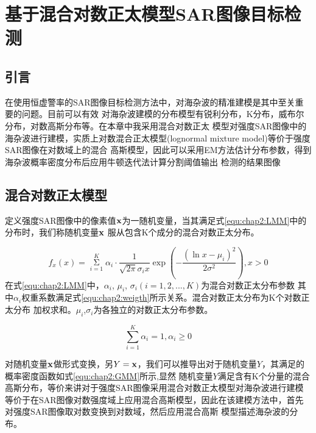 \chapter{基于混合对数正太模型SAR图像目标检测}
\label{cha:LMM}

\section{引言}
\label{sec:chap2:sec1}
在使用恒虚警率的SAR图像目标检测方法中，对海杂波的精准建模是其中至关重要的问题。目前可以有效
对海杂波建模的分布模型有锐利分布，K分布，威布尔分布，对数高斯分布等。在本章中我采用混合对数正太
模型对强度SAR图像中的海杂波进行建模，实质上对数混合正太模型(lognormal mixture model)等价于强度SAR图像在对数域上的混合
高斯模型，因此可以采用EM方法估计分布参数，得到海杂波概率密度分布后应用牛顿迭代法计算分割阈值输出
检测的结果图像


\section{混合对数正太模型}
\label{sec:chap2:sec2}
  定义强度SAR图像中的像素值$\bf{x}$为一随机变量，当其满足式\ref{equ:chap2:LMM}中的分布时，我们称随机变量$\bf{x}$
  服从包含K个成分的混合对数正太分布。

    \begin{equation}
      \label{equ:chap2:LMM}
      {f_x}(x) = \mathop \Sigma \limits_{i = 1}^K {\alpha _i} \cdot \frac{1}{{\sqrt {2\pi } {\sigma _i}x}}\exp ( - \frac{{{{(\ln x - {\mu _i})}^2}}}{{2{\sigma ^2}}}),x > 0
    \end{equation}
  在式\ref{equ:chap2:LMM}中，$\alpha_i$, $\mu_i$, $\sigma_i(i=1,2,...,K)$为混合对数正太分布参数
  其中$\alpha_i$权重系数满足式\ref{equ:chap2:weigth}所示关系。混合对数正太分布为K个对数正太分布
  加权求和。$\mu_i$,$\sigma_i$为各独立的对数正太分布参数。

    \begin{equation}
      \label{equ:chap2:weigth}
      \sum\limits_{i = 1}^K {{\alpha _i} = 1,{\alpha _i} \ge 0} 
    \end{equation}

  对随机变量$\bf{x}$做形式变换，另$Y=\bf{x}$，我们可以推导出对于随机变量$Y$，其满足的概率密度函数如式\ref{equ:chap2:GMM}所示,显然
  随机变量$Y$满足含有K个分量的混合高斯分布，等价来讲对于强度SAR图像采用混合对数正太模型对海杂波进行建模
  等价于在SAR图像对数强度域上应用混合高斯模型，因此在该建模方法中，首先对强度SAR图像取对数变换到对数域，然后应用混合高斯
  模型描述海杂波的分布。

